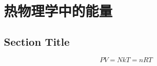 \chapter{热物理学中的能量}

\section{Section Title}

\begin{equation}\label{eq:IGL}
    PV=NkT=nRT
\end{equation}